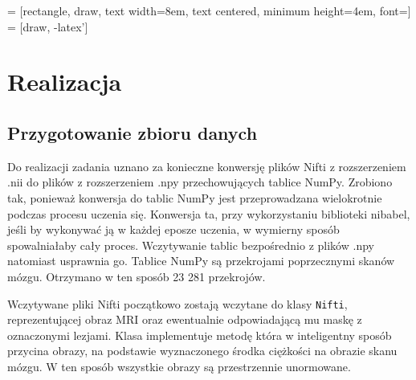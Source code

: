  = [rectangle, draw, text width=8em, text centered, minimum height=4em, font=\ttfamily]
 = [draw, -latex']

\section{Realizacja}
\label{sec:Execution}
\subsection{Przygotowanie zbioru danych}
\label{sec:preparing-of-dataset}
Do realizacji zadania uznano za konieczne konwersję plików Nifti z rozszerzeniem .nii do plików z rozszerzeniem .npy przechowujących tablice NumPy. Zrobiono tak, ponieważ konwersja do tablic NumPy jest przeprowadzana wielokrotnie podczas procesu uczenia się. Konwersja ta, przy wykorzystaniu biblioteki nibabel, jeśli by wykonywać ją w każdej eposze uczenia, w wymierny sposób spowalniałaby cały proces. Wczytywanie tablic bezpośrednio z plików .npy natomiast usprawnia go. Tablice NumPy są przekrojami poprzecznymi skanów mózgu. Otrzymano w ten sposób 23 281 przekrojów. 
\par 
Wczytywane pliki Nifti początkowo zostają wczytane do klasy \texttt{Nifti}, reprezentującej obraz MRI oraz ewentualnie odpowiadającą mu maskę z oznaczonymi lezjami. Klasa implementuje metodę która w inteligentny sposób przycina obrazy, na podstawie wyznaczonego środka ciężkości na obrazie skanu mózgu. W ten sposób wszystkie obrazy są przestrzennie unormowane.



